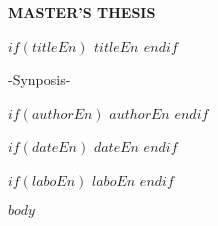 \documentclass[10pt,a4paper,dvipdfmx]{jreport}
\begin{document}
    \thispagestyle{empty}
    \clearpage

    
    \thispagestyle{empty}

    \clearpage

    \begin{center}
    {\fontsize{38pt}{40pt}\selectfont \bf MASTER'S THESIS \par} %
        \vspace{5cm}

        {\fontsize{30pt}{40pt}\selectfont
        \bf $if(titleEn)$ $titleEn$ $endif$\par }%
        \vspace{1cm}
        {\fontsize{30pt}{40pt}\selectfont
        -Synposis- \par }
        {\fontsize{30pt}{40pt}\selectfont
        $if(authorEn)$ $authorEn$ $endif$\par }%
        \vspace{1cm}

        {\fontsize{20pt}{10pt}\selectfont
        $if(dateEn)$ $dateEn$ $endif$ \par }%
        \vspace{5cm}
        {\fontsize{20pt}{10pt}\selectfont
        $if(laboEn)$ $laboEn$ $endif$
        \par }


    \end{center}
    \thispagestyle{empty}
    \clearpage
    
    \thispagestyle{empty}
    \clearpage

    \pagestyle{fancy}
    \rhead{-\thepage-}
    \lhead{}
    \chead{}
    \cfoot{}

    \tableofcontents


    \clearpage


    \pagestyle{fancy}


    $body$
    \rhead{-\thepage-}
    \chead{}
    \cfoot{}
\end{document}
